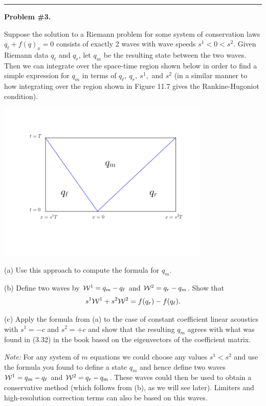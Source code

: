 \documentclass[11pt]{article}
\begin{document}



\newpage
\vskip 1cm
\hrule
{\bf Problem \#3.}

Suppose the solution to a Riemann problem for some system of conservation
laws $q_t +f(q)_x = 0$ 
consists of exactly 2 waves with wave speeds $s^1 < 0 < s^2$.  
Given Riemann data $q_\ell$ and $q_r$, let $q_m$ be the resulting state
between the two waves.
Then we can integrate over the space-time region shown below in order to
find a simple expression for $q_m$ in terms of $q_\ell,~ q_r, ~s^1,$ and
$s^2$ (in a similar manner to how integrating 
over the region shown in Figure 11.7 gives the Rankine-Hugoniot condition).

\hfil\includegraphics[width=4.0in]{qbox.png}\hfil


(a) Use this approach to compute the formula for $q_m$.

(b) Define two waves by ${\cal W}^1 = q_m-q_\ell$ and ${\cal W}^2 = q_r -
q_m$.  Show that
\[
s^1{\cal W}^1 + s^2 {\cal W}^2 = f(q_r) - f(q_\ell).
\]

(c) Apply the formula from (a) to the case of constant coefficient
linear acoustics with $s^1 = -c$ and $s^2 =
+c$ and show that the resulting $q_m$ agrees with what was found in (3.32)
in the book based on the eigenvectors of the coefficient matrix.

{\em Note:} For any system of $m$ equations we could choose any values $s^1
< s^2$ and use the formula you found to define a state $q_m$ and hence
define two waves ${\cal W}^1 = q_m-q_\ell$ and ${\cal W}^2 = q_r - q_m$.
These waves could then be used to obtain a conservative method (which
follows from (b), as we will see later).  Limiters
and high-resolution correction terms can also be based on this waves.
\end{document}
